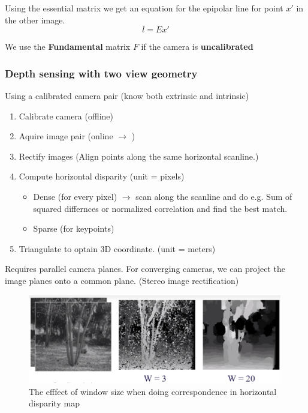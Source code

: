 \documentclass[a4paper]{article}
\begin{document}
Using the essential matrix we get an equation for the epipolar line for point $ x' $ in the other image.
\begin{equation}
l = E x'
\end{equation}

We use the \textbf{Fundamental} matrix $ F $ if the camera is \textbf{uncalibrated} 

\subsubsection{Depth sensing with two view geometry}
Using a calibrated camera pair (know both extrinsic and intrinsic)

\begin{enumerate}
	\item Calibrate camera (offline)
	\item Aquire image pair (online $ \rightarrow $  )
	\item Rectify images (Align points along the same horizontal scanline.)
	\item Compute horizontal disparity (unit = pixels) \\
	\begin{itemize}
		\item Dense (for every pixel) $ \rightarrow $ scan along the scanline and do e.g. Sum of squared differnces or normalized correlation and find the best match.
		\item Sparse (for keypoints)
	\end{itemize}
	\item Triangulate to optain 3D coordinate. (unit = meters)
\end{enumerate}

Requires parallel camera planes. 
For converging cameras, we can project the image planes onto a common plane. (Stereo image rectification)

\begin{figure}[H]
\centering
\includegraphics[width=0.99\textwidth]{figures/Window_size_correspondence_noise.png}
\caption{The efffect of window size when doing correspondence in horizontal disparity map}
\label{fig:window_size_correspondence_noise}
\end{figure} 
\end{document}
